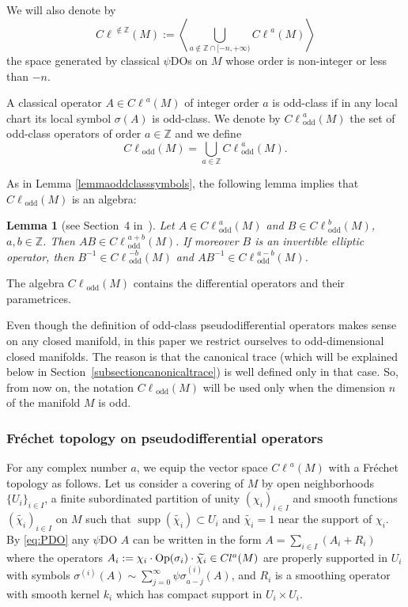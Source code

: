 \documentclass[11pt]{article}
\newtheorem{lemma}{Lemma}
\DeclareMathOperator{\odd}{odd} \DeclareMathOperator{\supp}{supp}
\newcommand{\Z}{{\mathbb Z}}
\def \Cl {{C\ell}}
\begin{document}
We will also denote by
\[
\Cl^{\notin\Z}(M):=\left\langle\bigcup\limits_{a\notin\Z\cap[-n,+\infty)}\Cl^{a}(M)\right\rangle
\]
the space generated by classical $\psi$DOs on $M$ whose order is non-integer or less than $-n$.

A classical operator $A\in \Cl^{a}(M)$ of integer order $a$ is odd-class if in any local chart its local symbol $\sigma(A)$ is odd-class.
We denote by $\Cl_{\odd}^a(M)$ the set of odd-class operators of order $a\in \mathbb{Z}$ and we def\/ine
\[
\Cl_{\odd}(M)=\bigcup_{a\in \mathbb{Z}} \Cl_{\odd}^a(M).
\]

As in Lemma \ref{lemmaoddclasssymbols}, the following lemma implies that $\Cl_{\odd}(M)$ is an algebra:
\begin{lemma}[see Section~4 in~\cite{kontsevichdeterminant}]\label{lema:oddClassproduct}
Let $A\in \Cl^{a}_{\odd}(M)$ and $B\in \Cl^{b}_{\odd}(M)$, $a,b\in\Z$. Then $AB\in \Cl^{a+b}_{\odd}(M)$. If moreover $B$ is an invertible elliptic operator, then $B^{-1}\in \Cl^{-b}_{\odd}(M)$ and $AB^{-1}\in \Cl^{a-b}_{\odd}(M)$.
\end{lemma}

The algebra $\Cl_{\odd}(M)$ contains the dif\/ferential operators and their parametrices.

\begin{remark}\label{remarknotationClodd}
Even though the def\/inition of odd-class pseudodif\/ferential operators makes sense on any closed manifold, in this paper we restrict ourselves to odd-dimensional closed manifolds. The reason is that the canonical trace (which will be explained below in Section~\ref{subsectioncanonicaltrace}) is well def\/ined only in that case. So, from now on, the notation $\Cl_{\odd}(M)$ will be used only when the dimension $n$ of the manifold $M$ is odd.
\end{remark}

\subsubsection{Fr\'echet topology on pseudodif\/ferential operators}\label{subsectionfrechettop}

For any complex number $a$,  we equip the vector space $\Cl^a(M)$ with a Fr\'echet topology as follows. Let us consider a covering of $M$ by open neighborhoods $\{U_i\}_{i\in I}$, a f\/inite subordinated partition of unity $(\chi_i)_{i\in I}$ and smooth functions $(\widetilde{\chi_i})_{i\in I}$ on $M$ such that $\supp(\widetilde{\chi_i})\subset U_i$ and $\widetilde{\chi_i}=1$ near the support of $\chi_i$. By \eqref{eq:PDO} any $\psi$DO $A$ can be written in the form $A=\sum\limits_{i\in I}(A_i+R_i)$ where the operators $A_i:=\chi_i\cdot\operatorname{Op}(\sigma_i)\cdot\widetilde{\chi_i}\in Cl^{a}(M)$ are properly supported in $U_i$ with symbols $\sigma^{(i)}(A)\sim\sum\limits_{j=0}^\infty\psi \sigma_{a-j}^{(i)}(A)$, and $R_i$ is a smoothing operator with smooth kernel $k_i$ which has compact support in $U_i\times U_i$.
\end{document}
